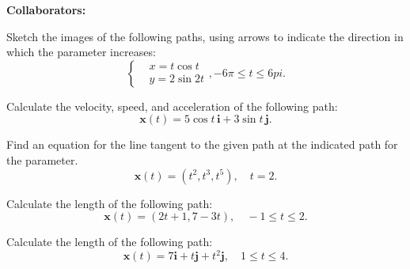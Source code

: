 \documentclass[11pt,letterpaper,boxed]{hmcpset}
\begin{document}
\noindent\textbf{Collaborators:} 


\begin{problem}[Colley 3.1 \#3]
Sketch the images of the following paths, using arrows to indicate the direction in which the parameter increases:
\begin{equation*}
	\begin{cases}
		&x = t\cos t\\
		&y = 2\sin 2t
	\end{cases}
	,-6\pi \leq t \leq 6pi.
\end{equation*}
\end{problem}

\begin{solution}
\vfill
\end{solution}
\newpage

\begin{problem}[Colley 3.1 \#10]
Calculate the velocity, speed, and acceleration of the following path:
\[
	\mathbf{x}(t) = 5\cos t \, \mathbf{i}+3\sin t \, \mathbf{j}.
\]
\end{problem}

\begin{solution}
\vfill
\end{solution}
\newpage

\begin{problem}[Colley 3.1 \#17]
Find an equation for the line tangent to the given path at the indicated path for the parameter.
\[
	\mathbf{x}(t) = (t^2,t^3,t^5), \quad t=2.
\]
\end{problem}

\begin{solution}
\vfill
\end{solution}
\newpage

\begin{problem}[Colley 3.2 \#1]
Calculate the length of the following path:
\[
	\mathbf{x}(t) = (2t+1,7-3t), \quad -1\leq t \leq 2.
\]
\end{problem}

\begin{solution}
\vfill
\end{solution}
\newpage

\begin{problem}[Colley 3.2 \#4]
Calculate the length of the following path:
\[
	\mathbf{x}(t) = 7\mathbf{i}+t\mathbf{j}+t^2\mathbf{j}, \quad 1 \leq t \leq 4.
\]
\end{problem}
\end{document}

